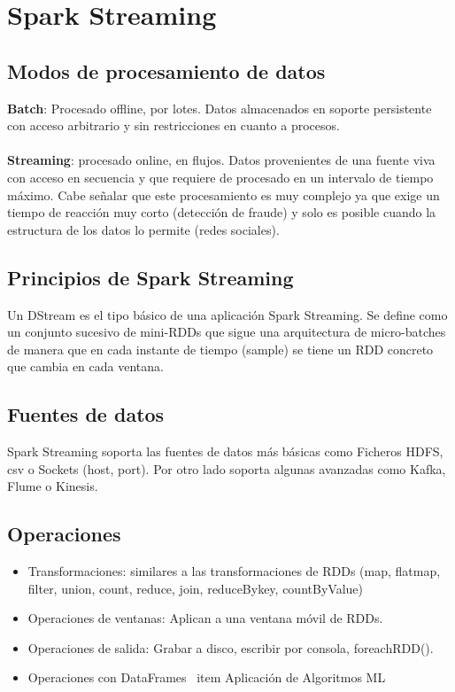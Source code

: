 \section{Spark Streaming}
\subsection{Modos de procesamiento de datos}
\textbf{Batch}: Procesado offline, por lotes. Datos almacenados en soporte persistente con acceso arbitrario y sin restricciones en cuanto a procesos.\\\\
\textbf{Streaming}: procesado online, en flujos. Datos provenientes de una fuente viva con acceso en secuencia y que requiere de procesado en un intervalo de tiempo máximo. Cabe señalar que este procesamiento es muy complejo ya que exige un tiempo de reacción muy corto (detección de fraude) y solo es posible cuando la estructura de los datos lo permite (redes sociales).
\subsection{Principios de Spark Streaming}
Un DStream es el tipo básico de una aplicación Spark Streaming. Se define como un conjunto sucesivo de mini-RDDs que sigue una arquitectura de micro-batches de manera que en cada instante de tiempo (sample) se tiene un RDD concreto que cambia en cada ventana.
\subsection{Fuentes de datos}
Spark Streaming soporta las fuentes de datos más básicas como Ficheros HDFS, csv o Sockets (host, port). Por otro lado soporta algunas avanzadas como Kafka, Flume o Kinesis.
\subsection{Operaciones}
\begin{itemize}
	\item Transformaciones: similares a las transformaciones de RDDs (map, flatmap, filter, union, count, reduce, join, reduceBykey, countByValue)
	\item Operaciones de ventanas: Aplican a una ventana móvil de RDDs.
	\item Operaciones de salida: Grabar a disco, escribir por consola, foreachRDD().
	\item Operaciones con DataFrames
	\ item Aplicación de Algoritmos ML
\end{itemize}
